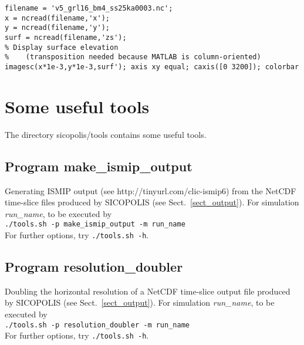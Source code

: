 \documentclass[12pt,a4paper]{article}
\begin{document}
\noindent\hspace*{5mm}\verb+filename = 'v5_grl16_bm4_ss25ka0003.nc';+
\\[-0.5ex]
\hspace*{5mm}\verb+x = ncread(filename,'x');+
\\[-0.5ex]
\hspace*{5mm}\verb+y = ncread(filename,'y');+
\\[-0.5ex]
\hspace*{5mm}\verb+surf = ncread(filename,'zs');+
\\[-0.5ex]
\hspace*{5mm}\verb+% Display surface elevation+
\\[-0.5ex]
\hspace*{5mm}\verb+%    (transposition needed because MATLAB is column-oriented)+
\\[-0.5ex]
\hspace*{5mm}\verb+imagesc(x*1e-3,y*1e-3,surf'); axis xy equal; caxis([0 3200]); colorbar+



\section{Some useful tools}
\label{sect_tools}

The directory sicopolis/tools contains some useful tools.

\subsection{Program make\_ismip\_output}
\label{ssect_make_ismip_output}

Generating ISMIP output (see http://tinyurl.com/clic-ismip6) from the NetCDF time-slice files produced by SICOPOLIS (see Sect.~\ref{sect_output}). For simulation \emph{run\_name}, to be executed by\\
\hspace*{10mm}\verb+./tools.sh -p make_ismip_output -m run_name+\\
For further options, try \verb+./tools.sh -h+.

\subsection{Program resolution\_doubler}
\label{ssect_resolution_doubler}

Doubling the horizontal resolution of a NetCDF time-slice output file produced by SICOPOLIS (see Sect.~\ref{sect_output}). For simulation \emph{run\_name}, to be executed by\\
\hspace*{10mm}\verb+./tools.sh -p resolution_doubler -m run_name+\\
For further options, try \verb+./tools.sh -h+.
\end{document}
